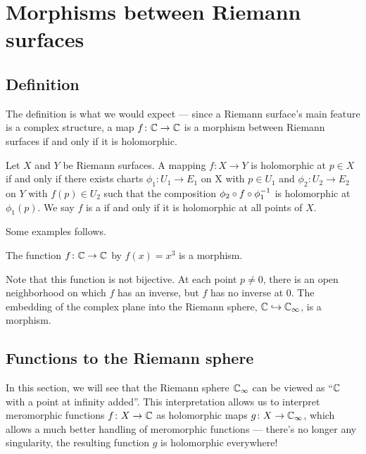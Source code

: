 \chapter{Morphisms between Riemann surfaces}
\label{ch:morphism_riemann}

\section{Definition}

The definition is what we would expect --- since a Riemann surface's main feature is a
complex structure, a map $f \colon \mathbb C \to \mathbb C$ is a morphism between Riemann surfaces
if and only if it is holomorphic.

\begin{definition}
	\label{def:riemann_surface_morphism}
	Let $X$ and $Y$ be Riemann surfaces. A mapping $f \colon X \to Y$ is holomorphic at $p \in X$ if
	and only if there exists charts $\phi_1 \colon U_1 \to E_1$ on X with $p \in U_1$ and $\phi_2
	\colon U_2 \to E_2$ on $Y$ with $f(p) \in U_2$ such that the composition $\phi_2 \circ f \circ
	\phi_1^{-1}$ is holomorphic at $\phi_1(p)$. We say $f$ is a  if and only if it is holomorphic at all points of $X$.
\end{definition}

\begin{example}
	Some examples follows.
	\begin{itemize}
		\ii The function $f \colon \mathbb C \to \mathbb C$ by $f(x) = x^3$ is a morphism.

		Note that this function is not bijective. At each point $p \neq 0$, there is an open
		neighborhood on which $f$ has an inverse, but $f$ has no inverse at $0$.
		\ii The embedding of the complex plane into the Riemann sphere, $\mathbb C \hookrightarrow \mathbb C_\infty$, is
		a morphism.
	\end{itemize}
\end{example}

\section{Functions to the Riemann sphere}

In this section, we will see that the Riemann sphere $\mathbb C_\infty$ can be viewed as ``$\mathbb C$ with a
point at infinity added''. This interpretation allows us to interpret meromorphic functions $f
\colon X \to \mathbb C$ as holomorphic maps $g \colon X \to \mathbb C_\infty$, which allows a much better
handling of meromorphic functions --- there's no longer any singularity, the resulting function
$g$ is holomorphic everywhere!

